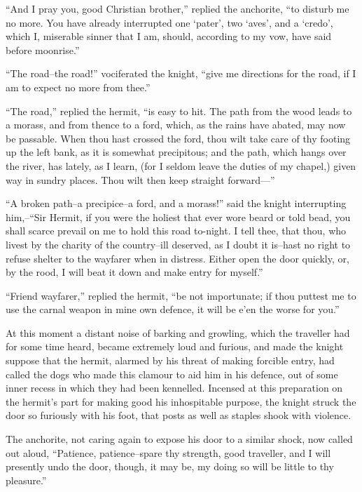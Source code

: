 ``And I pray you, good Christian brother,'' replied the anchorite, ``to
disturb me no more. You have already interrupted one `pater', two
`aves', and a `credo', which I, miserable sinner that I am, should,
according to my vow, have said before moonrise.''

``The road--the road!'' vociferated the knight, ``give me directions for
the road, if I am to expect no more from thee.''

``The road,'' replied the hermit, ``is easy to hit. The path from the
wood leads to a morass, and from thence to a ford, which, as the rains
have abated, may now be passable. When thou hast crossed the ford, thou
wilt take care of thy footing up the left bank, as it is somewhat
precipitous; and the path, which hangs over the river, has lately, as I
learn, (for I seldom leave the duties of my chapel,) given way in sundry
places. Thou wilt then keep straight forward---''

``A broken path--a precipice--a ford, and a morass!'' said the knight
interrupting him,--``Sir Hermit, if you were the holiest that ever wore
beard or told bead, you shall scarce prevail on me to hold this road
to-night. I tell thee, that thou, who livest by the charity of the
country--ill deserved, as I doubt it is--hast no right to refuse shelter
to the wayfarer when in distress. Either open the door quickly, or, by
the rood, I will beat it down and make entry for myself.''

``Friend wayfarer,'' replied the hermit, ``be not importunate; if thou
puttest me to use the carnal weapon in mine own defence, it will be e'en
the worse for you.''

At this moment a distant noise of barking and growling, which the
traveller had for some time heard, became extremely loud and furious,
and made the knight suppose that the hermit, alarmed by his threat of
making forcible entry, had called the dogs who made this clamour to aid
him in his defence, out of some inner recess in which they had been
kennelled. Incensed at this preparation on the hermit's part for making
good his inhospitable purpose, the knight struck the door so furiously
with his foot, that posts as well as staples shook with violence.

The anchorite, not caring again to expose his door to a similar shock,
now called out aloud, ``Patience, patience--spare thy strength, good
traveller, and I will presently undo the door, though, it may be, my
doing so will be little to thy pleasure.''

